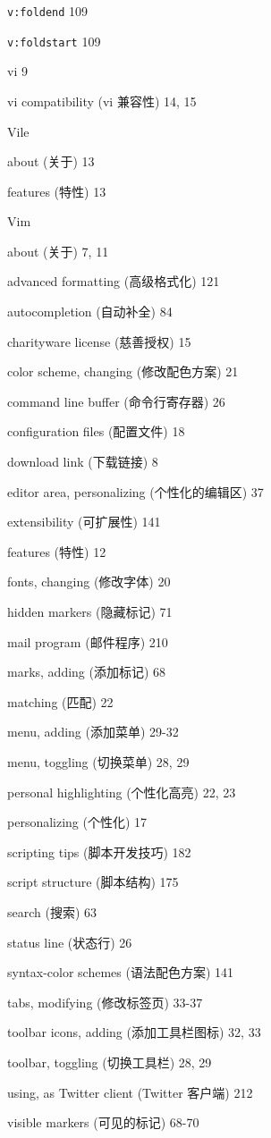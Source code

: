 \begin{multicols}{2}
\texttt{v:foldend} 109

\texttt{v:foldstart} 109

vi 9

vi compatibility (vi 兼容性) 14, 15

Vile \par
  about (关于) 13 \par
  features (特性) 13 \par

Vim \par
  about (关于) 7, 11 \par
  advanced formatting (高级格式化) 121 \par
  autocompletion (自动补全) 84 \par
  charityware license (慈善授权) 15 \par
  color scheme, changing (修改配色方案) 21 \par
  command line buffer (命令行寄存器) 26 \par
  configuration files (配置文件) 18 \par
  download link (下载链接) 8 \par
  editor area, personalizing (个性化的编辑区) 37 \par
  extensibility (可扩展性) 141 \par
  features (特性) 12 \par
  fonts, changing (修改字体) 20 \par
  hidden markers (隐藏标记) 71 \par
  mail program (邮件程序) 210 \par
  marks, adding (添加标记) 68 \par
  matching (匹配) 22 \par
  menu, adding (添加菜单) 29-32 \par
  menu, toggling (切换菜单) 28, 29 \par
  personal highlighting (个性化高亮) 22, 23 \par
  personalizing (个性化) 17 \par
  scripting tips (脚本开发技巧) 182 \par
  script structure (脚本结构) 175 \par
  search (搜索) 63 \par
  status line (状态行) 26 \par
  syntax-color schemes (语法配色方案) 141 \par
  tabs, modifying (修改标签页) 33-37 \par
  toolbar icons, adding (添加工具栏图标) 32, 33 \par
  toolbar, toggling (切换工具栏) 28, 29 \par
  using, as Twitter client (Twitter 客户端) 212 \par
  visible markers (可见的标记) 68-70 \par


\end{multicols}
